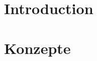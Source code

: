 \documentclass[12pt, a4paper]{report}
\begin{document}

\chapter{Introduction}

\chapter{Konzepte}

\printbibliography
\end{document}
